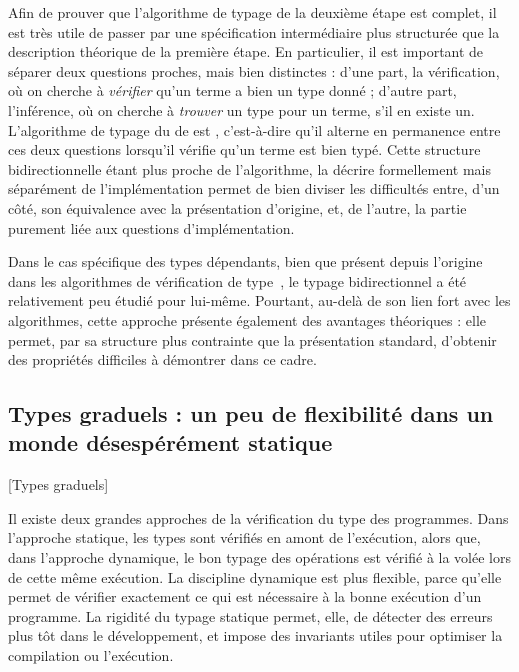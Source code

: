 Afin de prouver que l’algorithme de typage de la deuxième étape est complet,
il est très utile de
passer par une spécification intermédiaire plus structurée que la description
théorique de la première étape.
En particulier, il est important de séparer deux questions proches, mais
bien distinctes :
d’une part, la vérification, où on cherche à \emph{vérifier}
qu’un terme a bien un type donné ;
d’autre part, l’inférence, où on cherche à \emph{trouver}
un type pour un terme, s’il en existe un.
L’algorithme de typage du  de  est ,
c’est-à-dire qu’il alterne en permanence entre ces deux questions
lorsqu’il vérifie qu’un terme est bien typé.
Cette structure bidirectionnelle étant plus proche de l’algorithme,
la décrire formellement mais séparément de l’implémentation
permet de bien diviser les difficultés entre, d’un côté, son équivalence avec la présentation
d’origine, et, de l’autre, la partie purement liée aux questions d’implémentation.

Dans le cas spécifique des types dépendants, bien que présent depuis l’origine dans les algorithmes de vérification de type~,
le typage bidirectionnel a été relativement peu étudié pour lui-même.
Pourtant, au-delà de son lien fort avec les algorithmes,
cette approche présente également des avantages théoriques : elle permet,
par sa structure plus contrainte que la présentation standard,
d’obtenir des propriétés difficiles à démontrer dans ce cadre.

\subsection{Types graduels : un peu de flexibilité dans un monde désespérément statique}
  [Types graduels]
\label{sec:intro-graduel}

Il existe deux grandes approches de la vérification du type des programmes.
Dans l’approche statique,
les types sont vérifiés en amont de l’exécution, alors que, dans l’approche dynamique, le bon typage des opérations est vérifié à la volée lors de cette même exécution.
La discipline dynamique est plus flexible, parce qu’elle permet de vérifier exactement ce qui est nécessaire à la bonne exécution d’un programme.
La rigidité du typage statique permet, elle, de détecter des erreurs plus tôt dans le développement, et impose des invariants utiles pour optimiser la compilation ou l’exécution.

